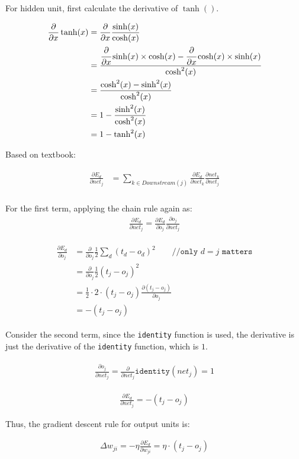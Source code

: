 \documentclass[preview]{standalone}
\begin{document}
For hidden unit, first calculate the derivative of $\tanh()$.

\begin{align}
\begin{split}
\frac{\partial}{\partial x}\tanh(x)
&=\frac{\partial}{\partial x}\frac{\sinh(x)}{\cosh(x)}\\
&=\cfrac{\cfrac{\partial}{\partial
    x}\sinh(x)\times\cosh(x)-\cfrac{\partial}{\partial
    x}\cosh(x)\times\sinh(x)}{\cosh^2(x)}\\
&=\frac{\cosh^2(x)-\sinh^2(x)}{\cosh^2(x)}\\
&=1-\frac{\sinh^2(x)}{\cosh^2(x)}\\
&=1-\tanh^2(x)
\end{split}
\end{align}

Based on textbook:

\begin{align}
\label{i0}
\begin{split}
\frac{\partial E_d}{\partial net_j}
&=\sum_{{k}\in{Downstream(j)}}\frac{\partial E_d}{\partial net_{{k}}}\frac{\partial net_{{k}}}{\partial net_{j}}\\
\end{split}
\end{align}

For the first term, applying the chain rule again as:
\begin{align}
\label{o0}
\frac{\partial E_d}{\partial net_j}=\frac{\partial E_d}{\partial o_j}\frac{\partial o_j}{\partial net_j}
\end{align}

\begin{align}
\label{o1}
\begin{split}
\frac{\partial E_d}{\partial o_j}
&=\frac{\partial}{\partial o_j}\frac{1}{2}\sum_d(t_d-o_d)^2\qquad\texttt{//only $d = j$ matters}\\
&=\frac{\partial}{\partial o_j}\frac{1}{2}(t_j-o_j)^2\\
&=\frac{1}{2} \cdot 2 \cdot (t_j-o_j)\frac{\partial(t_j-o_j)}{\partial o_j}\\
&=-(t_j-o_j)
\end{split}
\end{align}

Consider the second term, since the \texttt{identity} function is used, the
derivative is just the derivative of the \texttt{identity} function, which is
$1$.

\begin{align}
\label{o2}
\begin{split}
\frac{\partial o_j}{\partial net_j}=\frac{\partial}{\partial net_j}\mathtt{identity}(net_j) = 1
\end{split}
\end{align}


\begin{align}
    \frac{\partial E_d}{\partial net_j}=-(t_j-o_j)
\end{align}

Thus, the gradient descent rule for output units is:

\begin{align}
\Delta w_{ji} = -\eta\frac{\partial E_d}{\partial w_{ji}} = \eta \cdot (t_j-o_j)
\end{align}
\end{document}
